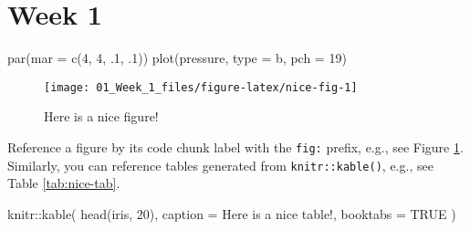 \documentclass[
]{book}
\newenvironment{Shaded}{\begin{snugshade}}{\end{snugshade}}
\newcommand{\AttributeTok}[1]{\textcolor[rgb]{0.77,0.63,0.00}{#1}}
\newcommand{\ConstantTok}[1]{\textcolor[rgb]{0.00,0.00,0.00}{#1}}
\newcommand{\DecValTok}[1]{\textcolor[rgb]{0.00,0.00,0.81}{#1}}
\newcommand{\FunctionTok}[1]{\textcolor[rgb]{0.00,0.00,0.00}{#1}}
\newcommand{\NormalTok}[1]{#1}
\newcommand{\SpecialCharTok}[1]{\textcolor[rgb]{0.00,0.00,0.00}{#1}}
\newcommand{\StringTok}[1]{\textcolor[rgb]{0.31,0.60,0.02}{#1}}
\begin{document}
\hypertarget{week-1}{%
\chapter*{Week 1}\label{week-1}}

\begin{Shaded}
\begin{Highlighting}[]
\FunctionTok{par}\NormalTok{(}\AttributeTok{mar =} \FunctionTok{c}\NormalTok{(}\DecValTok{4}\NormalTok{, }\DecValTok{4}\NormalTok{, .}\DecValTok{1}\NormalTok{, .}\DecValTok{1}\NormalTok{))}
\FunctionTok{plot}\NormalTok{(pressure, }\AttributeTok{type =} \StringTok{\textquotesingle{}b\textquotesingle{}}\NormalTok{, }\AttributeTok{pch =} \DecValTok{19}\NormalTok{)}
\end{Highlighting}
\end{Shaded}

\begin{figure}

{\centering \texttt{[image: 01\_Week\_1\_files/figure-latex/nice-fig-1]} 

}

\caption{Here is a nice figure!}\label{fig:nice-fig}
\end{figure}

Reference a figure by its code chunk label with the \texttt{fig:} prefix, e.g., see Figure \ref{fig:nice-fig}. Similarly, you can reference tables generated from \texttt{knitr::kable()}, e.g., see Table \ref{tab:nice-tab}.

\begin{Shaded}
\begin{Highlighting}[]
\NormalTok{knitr}\SpecialCharTok{::}\FunctionTok{kable}\NormalTok{(}
  \FunctionTok{head}\NormalTok{(iris, }\DecValTok{20}\NormalTok{), }\AttributeTok{caption =} \StringTok{\textquotesingle{}Here is a nice table!\textquotesingle{}}\NormalTok{,}
  \AttributeTok{booktabs =} \ConstantTok{TRUE}
\NormalTok{)}
\end{Highlighting}
\end{Shaded}
\end{document}
